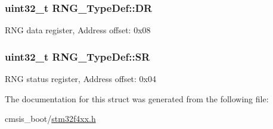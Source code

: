\subsubsection[{\texorpdfstring{DR}{DR}}]{ uint32\+\_\+t R\+N\+G\+\_\+\+Type\+Def\+::\+DR}\hypertarget{struct_r_n_g___type_def_a89f3352fb11cca430aaecc0c9b49c6d3}{}\label{struct_r_n_g___type_def_a89f3352fb11cca430aaecc0c9b49c6d3}
R\+NG data register, Address offset\+: 0x08 
\subsubsection[{\texorpdfstring{SR}{SR}}]{ uint32\+\_\+t R\+N\+G\+\_\+\+Type\+Def\+::\+SR}\hypertarget{struct_r_n_g___type_def_a4e4c38cd6a078fea5f9fa5e31bc0d326}{}\label{struct_r_n_g___type_def_a4e4c38cd6a078fea5f9fa5e31bc0d326}
R\+NG status register, Address offset\+: 0x04 

The documentation for this struct was generated from the following file\+:\begin{DoxyCompactItemize}
\item 
cmsis\+\_\+boot/\hyperlink{stm32f4xx_8h}{stm32f4xx.\+h}\end{DoxyCompactItemize}
